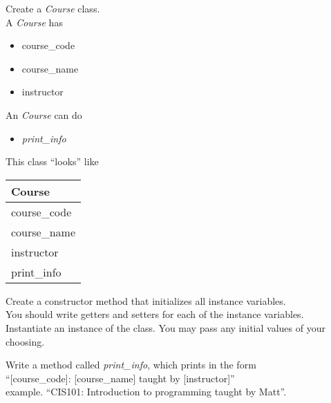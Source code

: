 \documentclass{article}
\newcommand{\tab}{\hspace*{0.25in}}
\begin{document}
\begin{enumerate}

	\begin{minipage}{.6\textwidth}
		\item Create a \textit{Course} class.\\
		A \textit{Course} has
		\begin{itemize}
			\item course\_code 
			\item course\_name
			\item instructor	
		\end{itemize}

		An \textit{Course} can do
		\begin{itemize}
			\item \textit{print\_info}
		\end{itemize}	
	\end{minipage}
	\begin{minipage}{.4\textwidth}
		This class ``looks'' like 
				
		\vspace*{1em}
		\begin{tabular}{|l|}
			\hline Course\\ \hline
			course\_code\\ course\_name\\ instructor\\ \hline
			print\_info\\  \hline
		\end{tabular}
	\end{minipage}

	\vspace*{2ex}
	Create a constructor method that initializes all instance variables.\\
	You should write getters and setters for each of the instance variables.\\
	Instantiate an instance of the class. You may pass any initial values of your choosing.

	Write a method called \textit{print\_info}, which prints in the form \\
		\tab \tab \tab ``[course\_code]: [course\_name] taught by [instructor]''\\
	example. ``CIS101: Introduction to programming taught by Matt''.\\





\end{enumerate}
\end{document}
